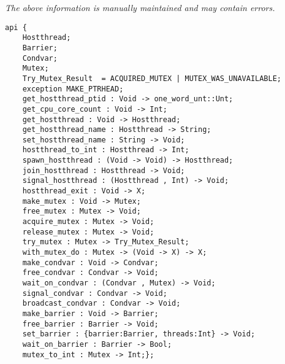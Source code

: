 \label{api:Hostthread}

{\tiny \it The above information is manually maintained and may contain errors.}
\begin{verbatim}
api {
    Hostthread;
    Barrier;
    Condvar;
    Mutex;
    Try_Mutex_Result  = ACQUIRED_MUTEX | MUTEX_WAS_UNAVAILABLE;
    exception MAKE_PTRHEAD;
    get_hostthread_ptid : Void -> one_word_unt::Unt;
    get_cpu_core_count : Void -> Int;
    get_hostthread : Void -> Hostthread;
    get_hostthread_name : Hostthread -> String;
    set_hostthread_name : String -> Void;
    hostthread_to_int : Hostthread -> Int;
    spawn_hostthread : (Void -> Void) -> Hostthread;
    join_hostthread : Hostthread -> Void;
    signal_hostthread : (Hostthread , Int) -> Void;
    hostthread_exit : Void -> X;
    make_mutex : Void -> Mutex;
    free_mutex : Mutex -> Void;
    acquire_mutex : Mutex -> Void;
    release_mutex : Mutex -> Void;
    try_mutex : Mutex -> Try_Mutex_Result;
    with_mutex_do : Mutex -> (Void -> X) -> X;
    make_condvar : Void -> Condvar;
    free_condvar : Condvar -> Void;
    wait_on_condvar : (Condvar , Mutex) -> Void;
    signal_condvar : Condvar -> Void;
    broadcast_condvar : Condvar -> Void;
    make_barrier : Void -> Barrier;
    free_barrier : Barrier -> Void;
    set_barrier : {barrier:Barrier, threads:Int} -> Void;
    wait_on_barrier : Barrier -> Bool;
    mutex_to_int : Mutex -> Int;};
\end{verbatim}
